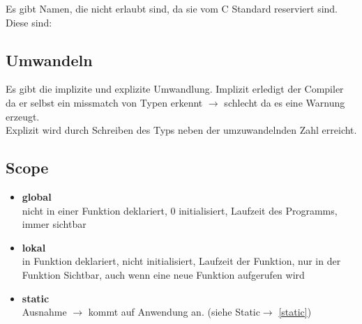 

Es gibt Namen, die nicht erlaubt sind, da sie vom C Standard reserviert sind. Diese sind:\\

{\tabcolsep=0.1cm
}

\subsection{Umwandeln}

Es gibt die implizite und explizite Umwandlung. Implizit erledigt der Compiler da er selbst ein missmatch von Typen erkennt $\rightarrow$ schlecht da es eine Warnung erzeugt.\\
Explizit wird durch Schreiben des Typs neben der umzuwandelnden Zahl erreicht.



\nextcol

\subsection{Scope}

\begin{itemize}[itemsep=1pt, parsep=0pt]
    \item \textbf{global} \\ nicht in einer Funktion deklariert, 0 initialisiert, Laufzeit des Programms, immer sichtbar
    \item \textbf{lokal} \\ in Funktion deklariert, nicht initialisiert, Laufzeit der Funktion, nur in der Funktion Sichtbar, auch wenn eine neue Funktion aufgerufen wird
    \item \textbf{static} \\ Ausnahme $\rightarrow$ kommt auf Anwendung an. (siehe Static$\rightarrow$ \ref{static})
\end{itemize}

